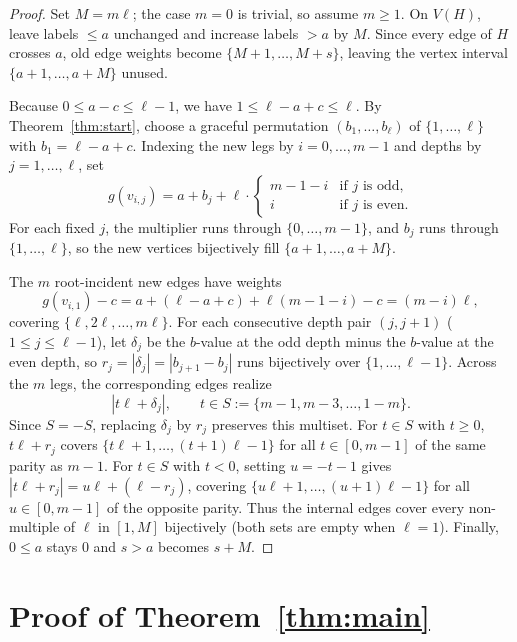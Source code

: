 \documentclass[11pt]{article}
\begin{document}
\begin{proof}
Set $M = m\ell$; the case $m = 0$ is trivial, so assume $m \ge 1$. On $V(H)$, leave labels $\le a$ unchanged and increase labels $> a$ by $M$. Since every edge of $H$ crosses $a$, old edge weights become $\{M + 1, \dots, M + s\}$, leaving the vertex interval $\{a + 1, \dots, a + M\}$ unused.

Because $0 \le a - c \le \ell - 1$, we have $1 \le \ell - a + c \le \ell$. By Theorem~\ref{thm:start}, choose a graceful permutation $(b_1, \dots, b_\ell)$ of $\{1, \dots, \ell\}$ with $b_1 = \ell - a + c$. Indexing the new legs by $i = 0, \dots, m - 1$ and depths by $j = 1, \dots, \ell$, set
\[
g(v_{i,j}) = a + b_j + \ell \cdot
\begin{cases}
m - 1 - i & \text{if } j \text{ is odd},\\
i & \text{if } j \text{ is even}.
\end{cases}
\]
For each fixed $j$, the multiplier runs through $\{0, \dots, m - 1\}$, and $b_j$ runs through $\{1, \dots, \ell\}$, so the new vertices bijectively fill $\{a + 1, \dots, a + M\}$.

The $m$ root-incident new edges have weights
\[
g(v_{i,1}) - c = a + (\ell - a + c) + \ell(m - 1 - i) - c = (m - i)\ell,
\]
covering $\{\ell, 2\ell, \dots, m\ell\}$. For each consecutive depth pair $(j, j + 1)$ ($1 \le j \le \ell - 1$), let $\delta_j$ be the $b$-value at the odd depth minus the $b$-value at the even depth, so $r_j = |\delta_j| = |b_{j+1} - b_j|$ runs bijectively over $\{1, \dots, \ell - 1\}$. Across the $m$ legs, the corresponding edges realize
\[
|t\ell + \delta_j|, \qquad t \in S := \{m - 1, m - 3, \dots, 1 - m\}.
\]
Since $S = -S$, replacing $\delta_j$ by $r_j$ preserves this multiset. For $t \in S$ with $t \ge 0$, $t\ell + r_j$ covers $\{t\ell + 1, \dots, (t + 1)\ell - 1\}$ for all $t \in [0, m - 1]$ of the same parity as $m - 1$. For $t \in S$ with $t < 0$, setting $u = -t - 1$ gives $|t\ell + r_j| = u\ell + (\ell - r_j)$, covering $\{u\ell + 1, \dots, (u + 1)\ell - 1\}$ for all $u \in [0, m - 1]$ of the opposite parity. Thus the internal edges cover every non-multiple of $\ell$ in $[1, M]$ bijectively (both sets are empty when $\ell = 1$). Finally, $0 \le a$ stays $0$ and $s > a$ becomes $s + M$.
\end{proof}

\section{Proof of Theorem~\ref{thm:main}}\label{sec:main}
\end{document}
